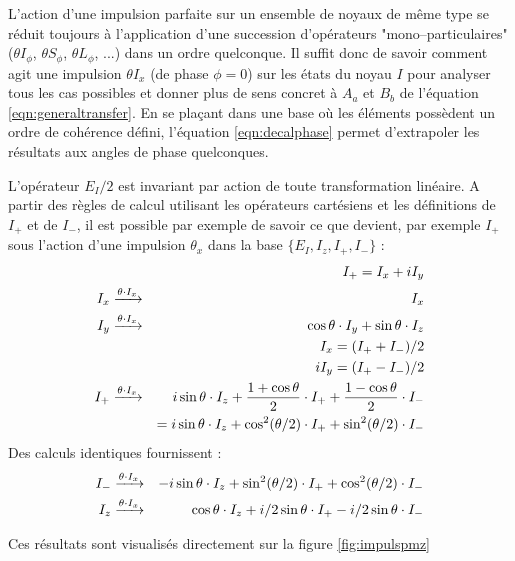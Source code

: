 L'action d'une impulsion parfaite sur un ensemble de noyaux de même type
se réduit toujours à l'application d'une succession d'opérateurs "mono--particulaires"
($\theta I_{\phi}$, $\theta S_{\phi}$, $\theta L_{\phi}$, ...) dans un ordre quelconque.
Il suffit donc de savoir comment agit une impulsion $\theta I_x$ (de phase $\phi = 0$) 
sur les états du noyau $I$ pour analyser tous les cas possibles et donner
plus de sens concret à $A_a$ et $B_b$ de l'équation \ref{eqn:generaltransfer}.
En se plaçant dans une base où les éléments possèdent un ordre de cohérence défini,
l'équation \ref{eqn:decalphase} permet d'extrapoler les résultats aux angles de phase
quelconques.

L'opérateur $E_I/2$ est invariant par action de toute transformation linéaire.
A partir des règles de calcul utilisant les opérateurs cartésiens et les
définitions de $I_+$ et de $I_-$, il est possible par exemple de savoir
ce que devient, par exemple $I_+$ sous l'action d'une impulsion $\theta_x$ dans la base 
$\{E_I, I_z, I_+, I_-\}$ :
\begin{eqnarray}
& & \quad I_+  = I_x + iI_y \\
I_x & \xrightarrow{\theta \cdot I_x} & I_x \\
I_y & \xrightarrow{\theta \cdot I_x} & 
\cos\theta \cdot I_y + \sin\theta \cdot I_z \\
& & \quad I_x = (I_+ + I_-)/2 \\
& & \quad iI_y = (I_+ - I_-)/2 \\
I_+ & \xrightarrow{\theta \cdot I_x} & i\sin\theta \cdot I_z
+\frac{1+\cos\theta}{2}\cdot I_+ +\frac{1-\cos\theta}{2}\cdot I_- \\
& & = i\sin\theta \cdot I_z + \cos^2(\theta/2) \cdot I_+ + \sin^2(\theta/2) \cdot I_-
\end{eqnarray}
Des calculs identiques fournissent :
\begin{eqnarray}
I_- & \xrightarrow{\theta \cdot I_x} &
-i\sin\theta \cdot I_z + \sin^2(\theta/2) \cdot I_+ + \cos^2(\theta/2) \cdot I_- \\
I_z & \xrightarrow{\theta \cdot I_x} &
\cos\theta \cdot I_z + i/2\sin\theta \cdot I_+ - i/2\sin\theta \cdot I_-
\end{eqnarray}

Ces résultats sont visualisés directement sur la figure
\ref{fig:impulspmz}

